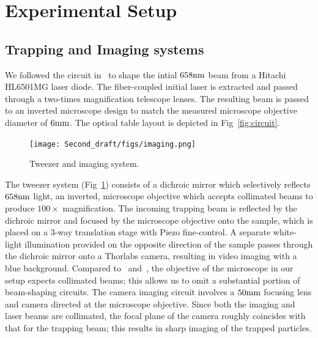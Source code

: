 \documentclass[aps,prb,twocolumn,superscriptaddress,floatfix,longbibliography,citeautoscript]{revtex4-2}
\begin{document}
\section{\label{sec:setup}Experimental Setup}
\subsection{\label{sec:imaging}Trapping and Imaging systems}
We followed the circuit in~\cite{OpticalTweezerInstructions} to shape 
the intial $658\mathrm{nm}$ beam from a Hitachi HL6501MG laser diode. 
The fiber-coupled initial laser is extracted and passed through a two-times 
magnification telescope lenses. 
The resulting beam is passed to an inverted microscope design to match the 
measured microscope objective diameter of $6\mathrm{mm}$. The optical table layout 
is depicted in Fig~\ref{fig:circuit}. 

\begin{figure}
    \centering
    \texttt{[image: Second\_draft/figs/imaging.png]}
    \caption{Tweezer and imaging system. }
    \label{fig:tweezing}
\end{figure}
The tweezer system (Fig~\ref{fig:tweezing}) consists of a 
dichroic mirror which selectively reflects $658\mathrm{nm}$ light, an inverted, microscope objective which accepts collimated beams to produce $100\times$ magnification. 
The incoming trapping beam is reflected by the dichroic mirror and focused by the microscope objective onto the sample, which is placed on a 3-way translation stage with Piezo fine-control. A separate white-light illumination provided on 
the opposite direction of the sample passes through the dichroic mirror onto 
a Thorlabs camera, resulting in video imaging with a blue background. 
Compared to~\cite{OpticalTweezerInstructions} and~\cite{Smith1999AJP}, the objective of the microscope in our setup expects collimated beams; this allows us to omit 
a substantial portion of beam-shaping circuits. The camera imaging circuit involves a $50\mathrm{mm}$ focusing lens 
and camera directed at the microscope objective. Since both the imaging and laser beams are collimated, the focal plane of the camera roughly coincides with that for the trapping beam; this results in sharp imaging of the trapped particles. 
\end{document}
